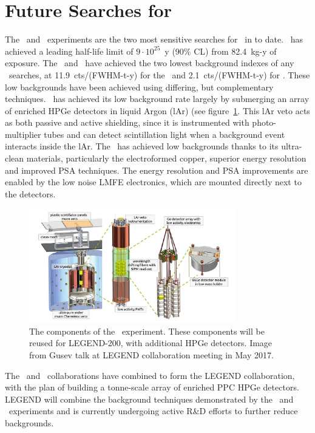 \documentclass[/main.tex]{subfiles}
\begin{document}
\section{Future Searches for  \znbb}
The \MJD\ and \Gerda\ experiments are the two most sensitive searches for \znbb\ in  to date.
\Gerda\ has achieved a leading half-life limit of $9\cdot10^{25}$~y (90\% CL) from 82.4~kg-y of exposure\cite{gerda}.
The \MJD\ and \Gerda\ have achieved the two lowest background indexes of any \znbb\ searches, at 11.9~cts/(FWHM-t-y) for the \MJD\ and 2.1~cts/(FWHM-t-y) for \Gerda.
These low backgrounds have been achieved using differing, but complementary techniques.
\Gerda\ has achieved its low background rate largely by submerging an array of enriched HPGe detectors in liquid Argon (lAr) (see figure~\ref{fig:legend200}.
This lAr veto acts as both passive and active shielding, since it is instrumented with photo-multiplier tubes and can detect scintillation light when a background event interacts inside the lAr.
The \MJD\ has achieved low backgrounds thanks to its ultra-clean materials, particularly the electroformed copper, superior energy resolution and improved PSA techniques.
The energy resolution and PSA improvements are enabled by the low noise LMFE electronics, which are mounted directly next to the detectors.
\\
\begin{figure}
  \centering
  \includegraphics[width=0.8\textwidth]{legend200}
  \caption[\Gerda\ experimental design]{\label{fig:legend200}
    The components of the \Gerda\ experiment. These components will be reused for LEGEND-200, with additional HPGe detectors. Image from Gusev talk at LEGEND collaboration meeting in May 2017.
  }
\end{figure}
The \MJ\ and \Gerda\ collaborations have combined to form the LEGEND collaboration, with the plan of building a tonne-scale array of enriched PPC HPGe detectors\cite{legend}.
LEGEND will combine the background techniques demonstrated by the \MJD\ and \Gerda\ experiments and is currently undergoing active R\&D efforts to further reduce backgrounds.
\end{document}
